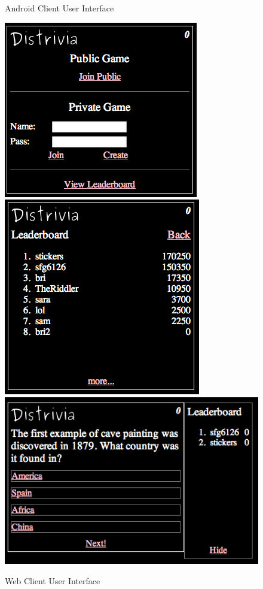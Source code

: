 \documentclass{dependencies/acm_proc_article-sp}
\begin{document}
\begin{figure}[h!]
   \caption{Android Client User Interface}
\end{figure}

\begin{figure}[h!]
   \includegraphics[scale=0.21]{web_join.png}
   \includegraphics[scale=0.21]{web_leader.png}
   \includegraphics[scale=0.21]{web_round.png}
   \caption{Web Client User Interface}
\end{figure}
\end{document}
